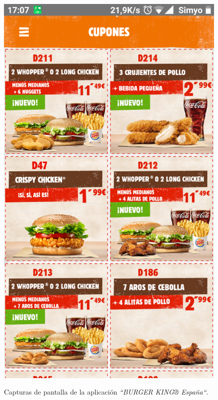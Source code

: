 \documentclass[twoside]{report}
\begin{document}
\begin{figure}[H]
\begin{center}
\includegraphics[scale=0.25]{images/restaurantes/burry1.png}
\caption{Capturas de pantalla de la aplicación \textit{“BURGER KING® España“}.} \cite{burgerk}
\end{center}
\end{figure}
\end{document}
